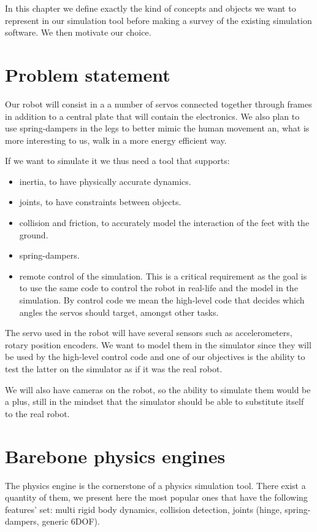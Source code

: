 In this chapter we define exactly the kind of concepts and objects we want to represent in our simulation tool before making a survey of the existing simulation software. We then motivate our choice.

\section{Problem statement}
Our robot will consist in a a number of servos connected together through frames in addition to a central plate that will contain the electronics. We also plan to use spring-dampers in the legs to better mimic the human movement an, what is more interesting to us, walk in a more energy efficient way.

If we want to simulate it we thus need a tool that supports:\begin{itemize}
\item inertia, to have physically accurate dynamics.
\item joints, to have constraints between objects.
\item collision and friction, to accurately model the interaction of the feet with the ground.
\item spring-dampers.
\item remote control of the simulation. This is a critical requirement as the goal is to use the same code to control the robot in real-life and the model in the simulation. By control code we mean the high-level code that decides which angles the servos should target, amongst other tasks.
\end{itemize}

The servo used in the robot will have several sensors such as accelerometers, rotary position encoders. We want to model them in the simulator since they will be used by the high-level control code and one of our objectives is the ability to test the latter on the simulator as if it was the real robot. 

We will also have cameras on the robot, so the ability to simulate them would be a plus, still in the mindset that the simulator should be able to substitute itself to the real robot.

\section{Barebone physics engines}
The physics engine is the cornerstone of a physics simulation tool. There exist a quantity of them, we present here the most popular ones that have the following features' set:  multi rigid body dynamics, collision detection, joints (hinge, spring-dampers, generic 6DOF).

